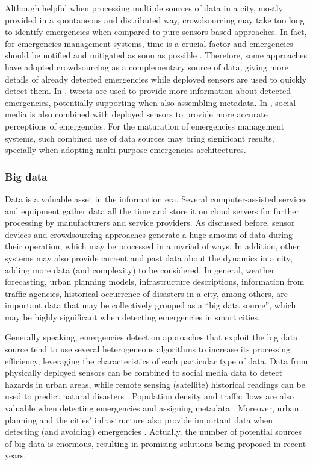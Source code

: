 \begin{refsection}
Although helpful when processing multiple sources of data in a city, mostly provided in a spontaneous and distributed way, crowdsourcing may take too long to identify emergencies when compared to pure sensors-based approaches. In fact, for emergencies management systems, time is a crucial factor and emergencies should be notified and mitigated as soon as possible \cite{citiesdisasters6}. Therefore, some approaches have adopted crowdsourcing as a complementary source of data, giving more details of already detected emergencies while deployed sensors are used to quickly detect them. In \cite{twitterDetection2}, tweets are used to provide more information about detected emergencies, potentially supporting when also assembling metadata. In \cite{crowdsourcing3}, social media is also combined with deployed sensors to provide more accurate perceptions of emergencies. For the maturation of emergencies management systems, such combined use of data sources may bring significant results, specially when adopting multi-purpose emergencies architectures.  

\subsubsection{Big data}

Data is a valuable asset in the information era. Several computer-assisted services and equipment gather data all the time and store it on cloud servers for further processing by manufacturers and service providers. As discussed before, sensor devices and crowdsourcing approaches generate a huge amount of data during their operation, which may be processed in a myriad of ways. In addition, other systems may also provide current and past data about the dynamics in a city, adding more data (and complexity) to be considered. In general, weather forecasting, urban planning models, infrastructure descriptions, information from traffic agencies, historical occurrence of disasters in a city, among others, are important data that may be collectively grouped as a ``big data source'', which may be highly significant when detecting emergencies in smart cities. 

Generally speaking, emergencies detection approaches that exploit the big data source tend to use several heterogeneous algorithms to increase its processing efficiency, leveraging the characteristics of each particular type of data. Data from physically deployed sensors can be combined to social media data to detect hazards in urban areas, while remote sensing (satellite) historical readings can be used to predict natural disasters \cite{satellite1,bigdata4}. Population density and traffic flows are also valuable when detecting emergencies and assigning metadata \cite{population1}. Moreover, urban planning and the cities' infrastructure also provide important data when detecting (and avoiding) emergencies \cite{urbanplanning1}. Actually, the number of potential sources of big data is enormous, resulting in promising solutions being proposed in recent years. 


\end{refsection}
